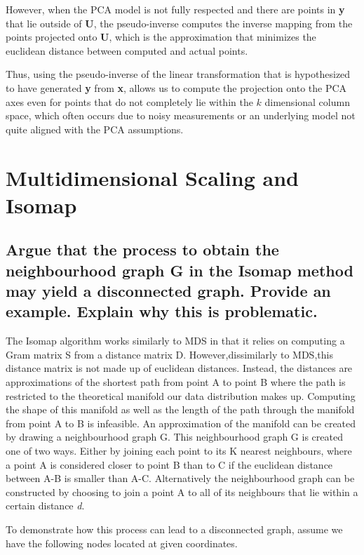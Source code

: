 \documentclass[11pt,a4paper,landscape]{article}
\begin{document}
However, when the PCA model is not fully respected and there are points in \textbf{y} that lie outside of \textbf{U}, the pseudo-inverse computes the inverse mapping from the points projected onto \textbf{U}, which is the approximation that minimizes the euclidean distance between computed and actual points\cite{pseudoinverse}.\newline

Thus, using the pseudo-inverse of the linear transformation that is hypothesized to have generated \textbf{y} from \textbf{x}, allows us to compute the projection onto the PCA axes even for points that do not completely lie within the $k$ dimensional column space, which often occurs due to noisy measurements or an underlying model not quite aligned with the PCA assumptions.


\section{Multidimensional Scaling and Isomap}

\subsection{Argue that the process to obtain the neighbourhood graph G in the Isomap method may yield a disconnected graph.  Provide an example.  Explain why this is problematic.}

The Isomap algorithm works similarly to MDS in that it relies on computing a Gram matrix S from a distance matrix D. However,dissimilarly to MDS,this distance matrix is not made up of euclidean distances. Instead, the distances are approximations of the shortest path from point A to point B where the path is restricted to the theoretical manifold our data distribution makes up. Computing the shape of this manifold as well as the length of the path through the manifold from point A to B is infeasible. An approximation of the manifold can be created by drawing a neighbourhood graph G. This neighbourhood graph G is created one of two ways. Either by joining each point to its K nearest neighbours, where a point A is considered closer to point B than to C if the euclidean distance between A-B is smaller than A-C.  Alternatively the neighbourhood graph can be constructed by choosing to join a point A to all of its neighbours that lie within a certain distance \textit{d}.\newline


To demonstrate how this process can lead to a disconnected graph,  assume we have the following nodes located at given coordinates.
\end{document}
